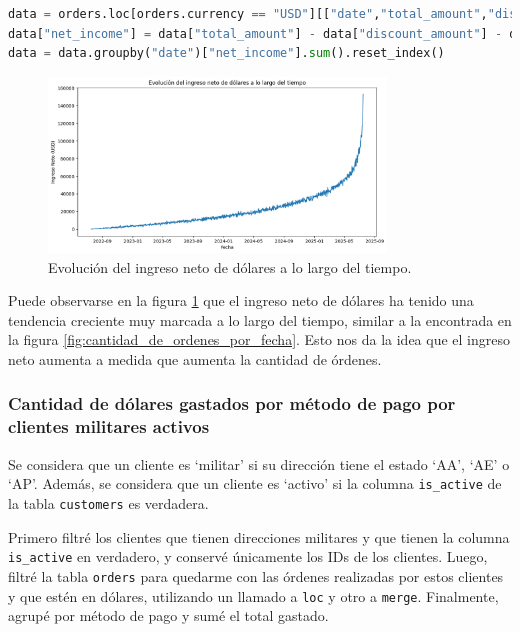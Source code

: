 \begin{lstlisting}[language=Python, xleftmargin=25pt, xrightmargin=25pt]
data = orders.loc[orders.currency == "USD"][["date","total_amount","discount_amount","tax_amount"]]
data["net_income"] = data["total_amount"] - data["discount_amount"] - data["tax_amount"]
data = data.groupby("date")["net_income"].sum().reset_index()
\end{lstlisting}

\begin{figure}[H]
    \centering
    \includegraphics[width=0.8\textwidth]{imagenes/consultas_propias/evolucion_ingreso_neto.png}
    \caption{Evolución del ingreso neto de dólares a lo largo del tiempo.}
    \label{fig:ingreso_neto}
\end{figure}

Puede observarse en la figura \ref{fig:ingreso_neto} que el ingreso neto de dólares ha tenido una tendencia creciente muy marcada a lo largo del tiempo, similar a la encontrada en la figura \ref{fig:cantidad_de_ordenes_por_fecha}. Esto nos da la idea que el ingreso neto aumenta a medida que aumenta la cantidad de órdenes.

\subsubsection{Cantidad de dólares gastados por método de pago por clientes militares activos}

Se considera que un cliente es `militar' si su dirección tiene el estado `AA', `AE' o `AP'. Además, se considera que un cliente es `activo' si la columna \texttt{is\_active} de la tabla \texttt{customers} es verdadera.

Primero filtré los clientes que tienen direcciones militares y que tienen la columna \texttt{is\_active} en verdadero, y conservé únicamente los IDs de los clientes. Luego, filtré la tabla \texttt{orders} para quedarme con las órdenes realizadas por estos clientes y que estén en dólares, utilizando un llamado a \texttt{loc} y otro a \texttt{merge}. Finalmente, agrupé por método de pago y sumé el total gastado.

